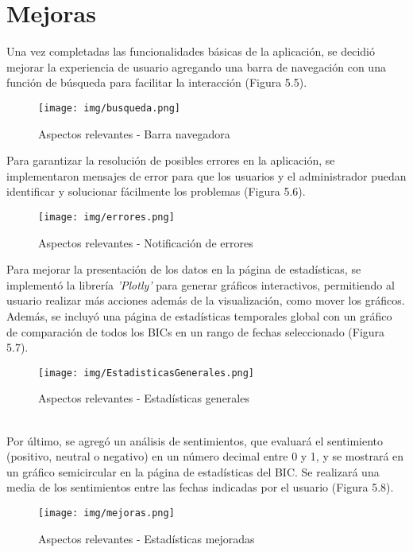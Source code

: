\section{Mejoras}
Una vez completadas las funcionalidades básicas de la aplicación, se decidió mejorar la experiencia de usuario agregando una barra de navegación con una función de búsqueda para facilitar la interacción (Figura 5.5).\\

\begin{figure}[h!]
    \centering
    \texttt{[image: img/busqueda.png]} \\
    \caption{Aspectos relevantes - Barra navegadora}
    \label{Aspectos relevantes - Barra navegadora}
\end{figure}
Para garantizar la resolución de posibles errores en la aplicación, se implementaron mensajes de error para que los usuarios y el administrador puedan identificar y solucionar fácilmente los problemas (Figura 5.6).\\
\begin{figure}[h!]
    \centering
    \texttt{[image: img/errores.png]} 
    \caption{Aspectos relevantes - Notificación de errores}
    \label{Aspectos relevantes - Notificación de errores}
\end{figure}
Para mejorar la presentación de los datos en la página de estadísticas, se implementó la librería \textit{'Plotly'} para generar gráficos interactivos, permitiendo al usuario realizar más acciones además de la visualización, como mover los gráficos.\\
Además, se incluyó una página de estadísticas temporales global con un gráfico de comparación de todos los BICs en un rango de fechas seleccionado (Figura 5.7).\\
\begin{figure}[h!]
    \centering
    \texttt{[image: img/EstadisticasGenerales.png]}
    \caption{Aspectos relevantes - Estadísticas generales}
    \label{Aspectos relevantes - Estadísticas generales}
\end{figure}
\\
Por último, se agregó un análisis de sentimientos, que evaluará el sentimiento (positivo, neutral o negativo) en un número decimal entre 0 y 1, y se mostrará en un gráfico semicircular en la página de estadísticas del BIC. Se realizará una media de los sentimientos entre las fechas indicadas por el usuario (Figura 5.8).\\
\begin{figure}[h!]
    \centering
    \texttt{[image: img/mejoras.png]} \\
    \caption{Aspectos relevantes - Estadísticas mejoradas}
    \label{Aspectos relevantes - Estadísticas mejoradas}
\end{figure}